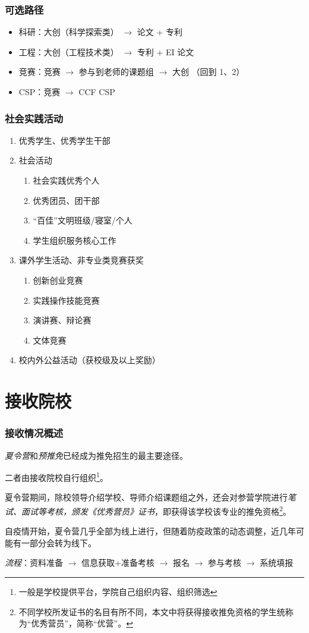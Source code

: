 \begin{frame}
	\frametitle{可选路径}
	\begin{itemize}
		\item 科研：大创（科学探索类） $\rightarrow$ 论文 + 专利
		\item 工程：大创（工程技术类） $\rightarrow$ 专利 + EI 论文
		\item 竞赛：竞赛 $\rightarrow$ 参与到老师的课题组 $\rightarrow$ 大创 （回到 1、2）
		\item CSP：竞赛 $\rightarrow$ CCF CSP
	\end{itemize}

\end{frame}

\begin{frame}
	\frametitle{社会实践活动}

	\begin{enumerate}
		\item 优秀学生、优秀学生干部
		\item 社会活动
		      \begin{enumerate}
			      \item 社会实践优秀个人
			      \item 优秀团员、团干部
			      \item “百佳”文明班级/寝室/个人
			      \item 学生组织服务核心工作
		      \end{enumerate}
		\item 课外学生活动、非专业类竞赛获奖
		      \begin{enumerate}
			      \item 创新创业竞赛
			      \item 实践操作技能竞赛
			      \item 演讲赛、辩论赛
			      \item 文体竞赛
		      \end{enumerate}
		\item 校内外公益活动（获校级及以上奖励）
	\end{enumerate}
\end{frame}


\section{接收院校}

\begin{frame}
	\frametitle{接收情况概述}
	\emph{夏令营}和\emph{预推免}已经成为推免招生的最主要途径。

	二者由接收院校自行组织\footnote{一般是学校提供平台，学院自己组织内容、组织筛选}。

	夏令营期间，除校领导介绍学校、导师介绍课题组之外，还会对参营学院进行\emph{笔试、面试等考核，颁发《优秀营员》证书}，即获得该学校该专业的推免资格\footnote{不同学校所发证书的名目有所不同，本文中将获得接收推免资格的学生统称为“优秀营员”，简称“优营”。}。

	自疫情开始，夏令营几乎全部为线上进行，但随着防疫政策的动态调整，近几年可能有一部分会转为线下。

	\emph{流程}：资料准备 $\rightarrow$ 信息获取+准备考核 $\rightarrow$ 报名 $\rightarrow$ 参与考核 $\rightarrow$ 系统填报
\end{frame}

